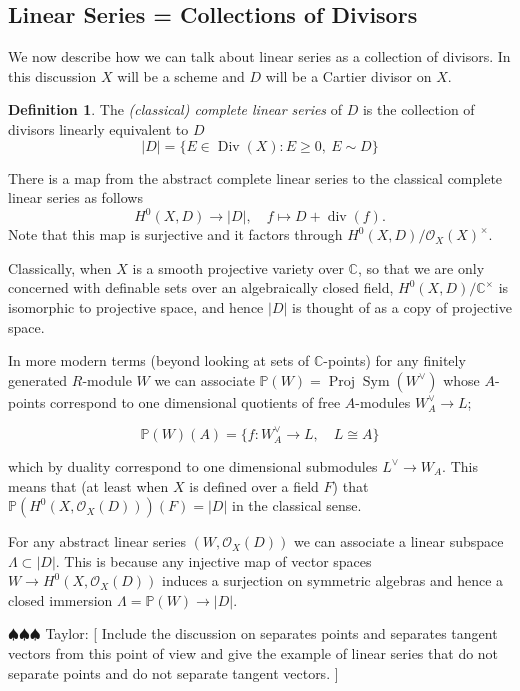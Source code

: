 \documentclass[12pt]{article}
\numberwithin{equation}{section}
\theoremstyle{definition}
\newtheorem{definition}[theorem]{Definition}
\theoremstyle{remark}
\newcommand{\CC}{\mathbb{C}}
\newcommand{\Ocal}{\mathcal{O}}
\newcommand{\PP}{\mathbb{P}}
\newcommand{\Proj}{\operatorname{Proj}}
\newcommand{\Div}{\operatorname{Div}}
\renewcommand{\div}{\operatorname{div}}
\newcommand{\Sym}{\operatorname{Sym}}
\newcommand{\taylor}[1]{{\color{blue} \sf $\spadesuit\spadesuit\spadesuit$ Taylor: [#1]}}
\begin{document}
\subsection{Linear Series = Collections of Divisors}

We now describe how we can talk about linear series as a collection of divisors.
In this discussion $X$ will be a scheme and $D$ will be a Cartier divisor on $X$.
\begin{definition}
The \emph{(classical) complete linear series} of $D$ is the collection of divisors linearly equivalent to $D$ 
 $$ \vert D \vert = \lbrace E \in \Div(X) \colon E \geq 0, \ E\sim D \rbrace $$
\end{definition}
There is a map from the abstract complete linear series to the classical complete linear series as follows
 $$ H^0(X,D) \to \vert D \vert , \quad f \mapsto D + \div(f). $$
Note that this map is surjective and it factors through $H^0(X,D)/\Ocal_X(X)^{\times}$.

Classically, when $X$ is a smooth projective variety over $\CC$, so that we are only concerned with definable sets over an algebraically closed field,  $H^0(X,D)/\CC^{\times}$ is isomorphic to projective space, and hence $\vert D \vert$ is thought of as a copy of projective space.

In more modern terms (beyond looking at sets of $\CC$-points) for any finitely generated $R$-module $W$ we can associate $\PP(W) = \Proj \Sym(W^{\vee})$ whose $A$-points correspond to one dimensional quotients of free $A$-modules $W^{\vee}_A \to L$; 

$$\PP(W)(A) = \lbrace f: W_A^{\vee} \to L, \quad L\cong A \rbrace $$

which by duality correspond to one dimensional submodules $L^{\vee} \to W_A$. 
This means that (at least when $X$ is defined over a field $F$) that $\PP(H^0(X,\Ocal_X(D)))(F) = \vert D \vert$ in the classical sense.
 
For any abstract linear series $(W,\Ocal_X(D))$ we can associate a linear subspace $\Lambda \subset \vert D \vert$.
This is because any injective map of vector spaces $W \to H^0(X,\Ocal_X(D))$ induces a surjection on symmetric algebras and hence a closed immersion  $\Lambda = \PP(W) \to \vert D \vert $.

\taylor{
Include the discussion on separates points and separates tangent vectors from this point of view and give the example of linear series that do not separate points and do not separate tangent vectors.
}
\end{document}
